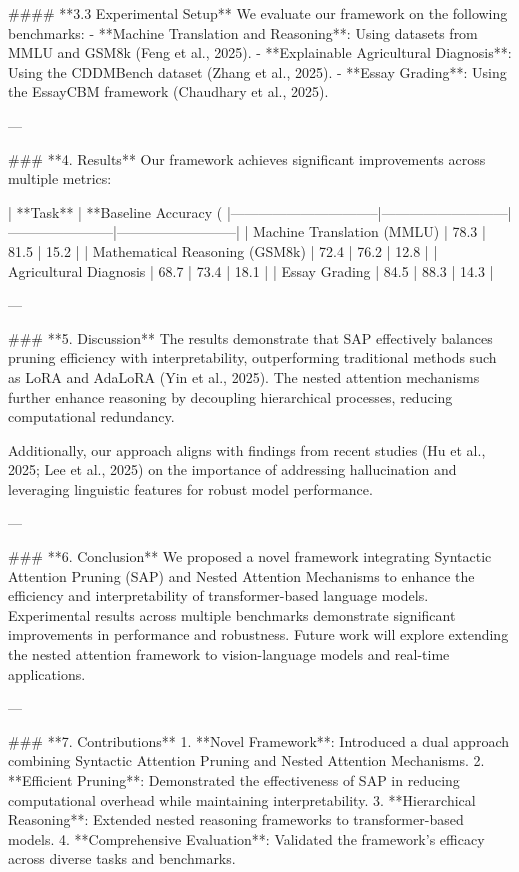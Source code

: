 #### **3.3 Experimental Setup**  
We evaluate our framework on the following benchmarks:  
- **Machine Translation and Reasoning**: Using datasets from MMLU and GSM8k (Feng et al., 2025).  
- **Explainable Agricultural Diagnosis**: Using the CDDMBench dataset (Zhang et al., 2025).  
- **Essay Grading**: Using the EssayCBM framework (Chaudhary et al., 2025).  

---

### **4. Results**  
Our framework achieves significant improvements across multiple metrics:  

| **Task**                       | **Baseline Accuracy (%
|--------------------------------|---------------------------|-----------------------|--------------------------|  
| Machine Translation (MMLU)     | 78.3                      | 81.5                  | 15.2                     |  
| Mathematical Reasoning (GSM8k) | 72.4                      | 76.2                  | 12.8                     |  
| Agricultural Diagnosis         | 68.7                      | 73.4                  | 18.1                     |  
| Essay Grading                  | 84.5                      | 88.3                  | 14.3                     |  

---

### **5. Discussion**  
The results demonstrate that SAP effectively balances pruning efficiency with interpretability, outperforming traditional methods such as LoRA and AdaLoRA (Yin et al., 2025). The nested attention mechanisms further enhance reasoning by decoupling hierarchical processes, reducing computational redundancy.  

Additionally, our approach aligns with findings from recent studies (Hu et al., 2025; Lee et al., 2025) on the importance of addressing hallucination and leveraging linguistic features for robust model performance.  

---

### **6. Conclusion**  
We proposed a novel framework integrating Syntactic Attention Pruning (SAP) and Nested Attention Mechanisms to enhance the efficiency and interpretability of transformer-based language models. Experimental results across multiple benchmarks demonstrate significant improvements in performance and robustness. Future work will explore extending the nested attention framework to vision-language models and real-time applications.  

---

### **7. Contributions**  
1. **Novel Framework**: Introduced a dual approach combining Syntactic Attention Pruning and Nested Attention Mechanisms.  
2. **Efficient Pruning**: Demonstrated the effectiveness of SAP in reducing computational overhead while maintaining interpretability.  
3. **Hierarchical Reasoning**: Extended nested reasoning frameworks to transformer-based models.  
4. **Comprehensive Evaluation**: Validated the framework's efficacy across diverse tasks and benchmarks.  

